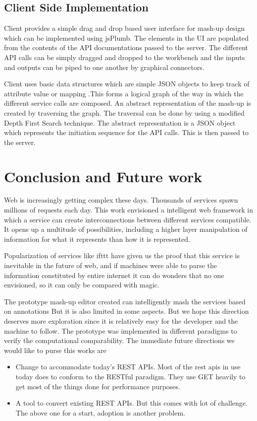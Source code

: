 \documentclass[journal]{IEEEtran}
\begin{document}
\subsection{Client Side Implementation}
Client provides a simple drag and drop based user interface for mash-up design which can be implemented using jsPlumb\cite{jsplumb}. The elements in the UI are populated from the contents of the API documentations passed to the server. The different API calls can be simply dragged and dropped to the workbench and the inputs and outputs can be piped to one another by graphical connectors.

Client uses basic data structures which are simple JSON objects to keep track of attribute value or mapping .This forms a logical graph of the way in which the different service calls are composed. An abstract representation of the mash-up is created by traversing the graph. The traversal can be done by using a modified Depth First Search technique. The abstract representation is a JSON object which represents the initiation sequence for the API calls. This is then passed to the server.


\section{Conclusion and Future work}


Web is increasingly getting complex these days. Thousands of services spawn millions of requests each day. This work envisioned a intelligent web framework in which a service can create interconnections between different services compatible. It opens up a multitude of possibilities, including a higher layer manipulation of information for what it represents than how it is represented.

Popularization of services like ifttt\cite{ift} have given us the proof that this service is inevitable in the future of web, and if machines were able to parse the information constituted by entire internet it can do wonders that no one envisioned, so it can only be compared with magic.

The prototype mash-up editor created can intelligently mash the services based on annotations But it is also limited in some aspects. But we hope this direction deserves more exploration since it is relatively easy for the developer and the machine to follow. The prototype was implemented in different paradigms to verify the computational comparability.
The immediate future directions we would like to purse this works are
\begin{itemize}
\item Change to accommodate today's REST APIs. Most of the rest apis in use today does to conform to the RESTful paradigm. They use GET heavily to get most of the things done for performance purposes.
\item A tool to convert existing REST APIs. But this comes with lot of challenge. The above one for a start, adoption is another problem.
\end{itemize}






\end{document}
